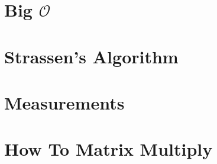 \begin{frame}
\titlepage
\end{frame}
%
\section{Big $\mathcal{O}$}

\section{Strassen's Algorithm}

% 
\section{Measurements}

% 
\section{How To Matrix Multiply}

